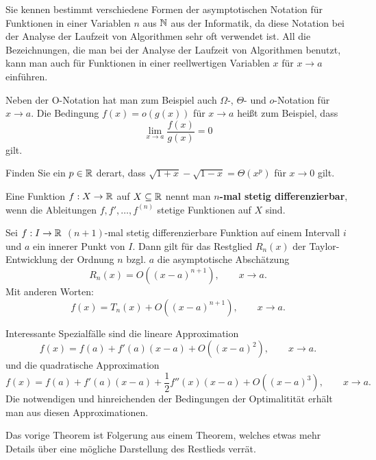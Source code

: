 \begin{bem}
	Sie kennen bestimmt verschiedene Formen der asymptotischen Notation für Funktionen  in einer Variablen $n$ aus $\mathbb{N}$ aus der Informatik, da diese Notation bei der Analyse der Laufzeit von Algorithmen sehr oft verwendet ist. All die Bezeichnungen, die man bei der Analyse der Laufzeit von Algorithmen benutzt, kann man auch für Funktionen in einer reellwertigen Variablen $x$ für $x \to a$ einführen. 
	
	Neben der O-Notation hat man zum Beispiel auch $\Omega$-, $\Theta$- und $o$-Notation für $x \to a$. Die Bedingung $f(x) = o(g(x))$ für $x \to a$ heißt zum Beispiel, dass 
	\[
		\lim_{x \to a} \frac{f(x)}{g(x)} = 0
	\]
	gilt. 
\end{bem} 

\begin{aufg}
	Finden Sie ein $p \in \mathbb{R}$ derart, dass $\sqrt{1+x} - \sqrt{1-x} = \Theta (x^p)$ für $x \to 0$ gilt. 
\end{aufg} 


\begin{defn}
	Eine Funktion $f: X \to \mathbb{R}$ auf $X \subseteq \mathbb{R}$ nennt man \textbf{$n$-mal stetig differenzierbar}, wenn die Ableitungen $f, f',\ldots, f^{(n)}$ stetige Funktionen auf $X$ sind. 
\end{defn} 

\begin{thm}  
	Sei $f : I \to \mathbb{R}$ $(n+1)$-mal stetig differenzierbare Funktion auf einem Intervall $i$  und $a$ ein innerer Punkt von $I$. Dann gilt für das Restglied $R_n(x)$ der Taylor-Entwicklung  der Ordnung $n$ bzgl. $a$ die asymptotische Abschätzung
	\[
		R_n(x) = O( (x-a)^{n+1}), \qquad x \to a. 
	\]
	Mit anderen Worten: 
	\[
		f(x) = T_n(x) + O((x-a)^{n+1}), \qquad x \to a. 
	\]
\end{thm} 

\begin{bem}
	Interessante Spezialfälle sind die lineare Approximation
	\[
		f(x) = f(a)+ f'(a) (x-a) + O((x-a)^2), \qquad x \to a. 
	\]
	und die quadratische Approximation
	\[
		f(x) = f(a) + f'(a)(x-a) + \frac{1}{2} f''(x) (x-a) + O((x-a)^3), \qquad x \to a. 
	\]
	Die notwendigen und hinreichenden der Bedingungen der Optimalitität erhält man aus diesen Approximationen. 
\end{bem}


\begin{bem} 
	Das vorige Theorem ist Folgerung aus einem Theorem, welches etwas mehr Details über eine mögliche Darstellung des Restlieds verrät. 
\end{bem} 

